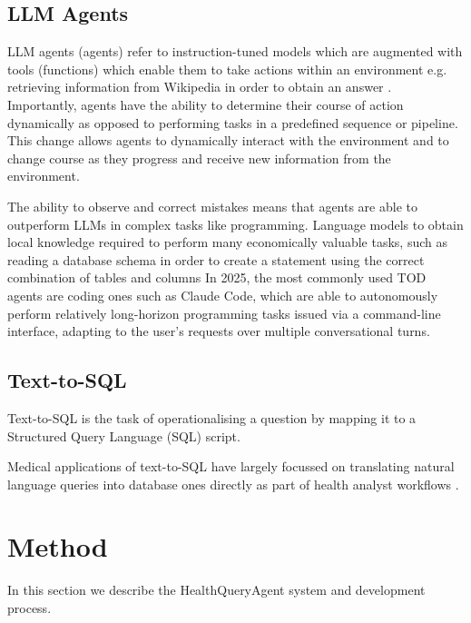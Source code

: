 \documentclass[11pt]{article}
\begin{document}

\subsection{LLM Agents}
LLM agents (agents) refer to instruction-tuned models which are augmented with tools (functions) which enable them to take actions within an environment e.g. retrieving information from Wikipedia in order to obtain an answer \cite{yao_reac_2023}. Importantly, agents have the ability to determine their course of action dynamically as opposed to performing tasks in a predefined sequence or pipeline. This change allows agents to dynamically interact with the environment and to change course as they progress and receive new information from the environment.


The ability to observe and correct mistakes means that agents are able to outperform LLMs in complex tasks like programming.
Language models to obtain local knowledge required to perform many economically valuable tasks, such as reading a database schema in order to create a statement using the correct combination of tables and columns 
In 2025, the most commonly used TOD agents are coding ones such as Claude Code, which are able to autonomously perform relatively long-horizon programming tasks issued via a command-line interface, adapting to the user's requests over multiple conversational turns\cite{METR}.


\subsection{Text-to-SQL}
Text-to-SQL is the task of operationalising a question by mapping it to a Structured Query Language (SQL) script.

Medical applications of text-to-SQL have largely focussed on translating natural language queries into database ones directly as part of health analyst workflows \citet{ziletti_retrieval_2024}.

\section{Method}
In this section we describe the HealthQueryAgent system and development process.
\end{document}
